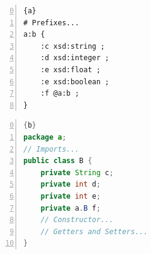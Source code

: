 \begin{center}
	\noindent\begin{minipage}[t]{.4\textwidth}
		\begin{lstlisting}[frame=topline,numbers=left,firstnumber=0,title=\scriptsize\texttt{Synthetic.shexl}, basicstyle=\ttfamily\scriptsize]{a}
# Prefixes...
a:b {
	:c xsd:string ;
	:d xsd:integer ;
	:e xsd:float ;
	:e xsd:boolean ;
	:f @a:b ;
}
		\end{lstlisting}
	\end{minipage}\hfill
	\begin{minipage}[t]{.5\textwidth}
		\begin{lstlisting}[language=Java, frame=t,numbers=left,firstnumber=0,title=\scriptsize\texttt{Synthetic.java}, basicstyle=\ttfamily\scriptsize]{b}
package a;
// Imports...
public class B {
	private String c;
	private int d;
	private int e;
	private a.B f;
	// Constructor...
	// Getters and Setters...
}
		\end{lstlisting}
	\end{minipage}
	\label{fig:example-4}
\end{center}